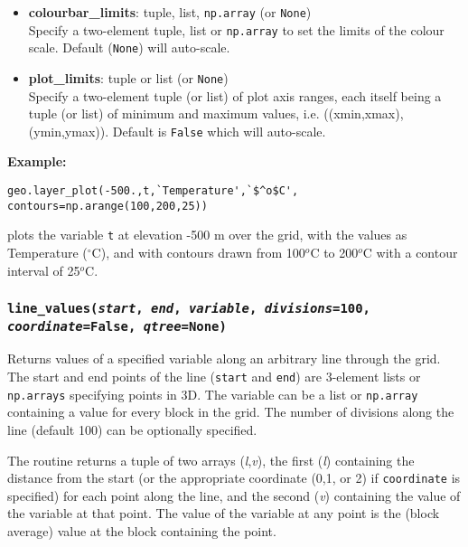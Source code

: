 \begin{itemize}
\item \textbf{colourbar\_limits}: tuple, list, \texttt{np.array} (or \texttt{None})\\
  Specify a two-element tuple, list or \texttt{np.array} to set the limits of the colour scale.  Default (\texttt{None}) will auto-scale.
\item \textbf{plot\_limits}: tuple or list (or \texttt{None})\\
  Specify a two-element tuple (or list) of plot axis ranges, each itself being a tuple (or list) of minimum and maximum values, i.e. ((xmin,xmax),(ymin,ymax)).  Default is \texttt{False} which will auto-scale.
\end{itemize}

\textbf{Example:}

\begin{verbatim}
geo.layer_plot(-500.,t,`Temperature',`$^o$C', contours=np.arange(100,200,25))
\end{verbatim}

plots the variable \texttt{t} at elevation -500 m over the grid, with the values as Temperature ($^{\circ}$C), and with contours drawn from 100$^o$C to 200$^o$C with a contour interval of 25$^o$C.

\subsubsection{\texttt{line\_values(\emph{start}, \emph{end}, \emph{variable}, \emph{divisions}=100, \emph{coordinate}=\texttt{False}, \emph{qtree}=None)}}

Returns values of a specified variable along an arbitrary line through the grid.  The start and end points of the line (\texttt{start} and \texttt{end}) are 3-element lists or \texttt{np.arrays} specifying points in 3D.  The variable can be a list or \texttt{np.array} containing a value for every block in the grid.  The number of divisions along the line (default 100) can be optionally specified.

The routine returns a tuple of two arrays (\emph{l},\emph{v}), the first (\emph{l}) containing the distance from the start (or the appropriate coordinate (0,1, or 2) if \texttt{coordinate} is specified) for each point along the line, and the second (\emph{v}) containing the value of the variable at that point.  The value of the variable at any point is the (block average) value at the block containing the point.

